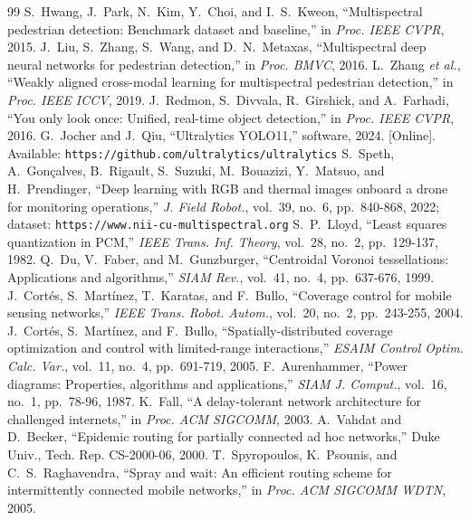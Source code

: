 \documentclass[conference]{IEEEtran}
\begin{document}
\begingroup\scriptsize\setlength{\itemsep}{0pt}\setlength{\parskip}{0pt}\begin{thebibliography}{99}
 S.~Hwang, J.~Park, N.~Kim, Y.~Choi, and I.~S.~Kweon, ``Multispectral pedestrian detection: Benchmark dataset and baseline,'' in \emph{Proc. IEEE CVPR}, 2015.
 J.~Liu, S.~Zhang, S.~Wang, and D.~N.~Metaxas, ``Multispectral deep neural networks for pedestrian detection,'' in \emph{Proc. BMVC}, 2016.
 L.~Zhang \emph{et al.}, ``Weakly aligned cross-modal learning for multispectral pedestrian detection,'' in \emph{Proc. IEEE ICCV}, 2019.
 J.~Redmon, S.~Divvala, R.~Girshick, and A.~Farhadi, ``You only look once: Unified, real-time object detection,'' in \emph{Proc. IEEE CVPR}, 2016.
 G.~Jocher and J.~Qiu, ``Ultralytics YOLO11,'' software, 2024. [Online]. Available: \nolinkurl{https://github.com/ultralytics/ultralytics}
 S.~Speth, A.~Gon\c{c}alves, B.~Rigault, S.~Suzuki, M.~Bouazizi, Y.~Matsuo, and H.~Prendinger, ``Deep learning with RGB and thermal images onboard a drone for monitoring operations,'' \emph{J. Field Robot.}, vol.~39, no.~6, pp.~840-868, 2022; dataset: \nolinkurl{https://www.nii-cu-multispectral.org}
 S.~P.~Lloyd, ``Least squares quantization in PCM,'' \emph{IEEE Trans. Inf. Theory}, vol.~28, no.~2, pp.~129-137, 1982.
 Q.~Du, V.~Faber, and M.~Gunzburger, ``Centroidal Voronoi tessellations: Applications and algorithms,'' \emph{SIAM Rev.}, vol.~41, no.~4, pp.~637-676, 1999.
 J.~Cort\'es, S.~Mart\'inez, T.~Karatas, and F.~Bullo, ``Coverage control for mobile sensing networks,'' \emph{IEEE Trans. Robot. Autom.}, vol.~20, no.~2, pp.~243-255, 2004.
 J.~Cort\'es, S.~Mart\'inez, and F.~Bullo, ``Spatially-distributed coverage optimization and control with limited-range interactions,'' \emph{ESAIM Control Optim. Calc. Var.}, vol.~11, no.~4, pp.~691-719, 2005.
 F.~Aurenhammer, ``Power diagrams: Properties, algorithms and applications,'' \emph{SIAM J. Comput.}, vol.~16, no.~1, pp.~78-96, 1987.
 K.~Fall, ``A delay-tolerant network architecture for challenged internets,'' in \emph{Proc. ACM SIGCOMM}, 2003.
 A.~Vahdat and D.~Becker, ``Epidemic routing for partially connected ad hoc networks,'' Duke Univ., Tech. Rep. CS-2000-06, 2000.
 T.~Spyropoulos, K.~Psounis, and C.~S.~Raghavendra, ``Spray and wait: An efficient routing scheme for intermittently connected mobile networks,'' in \emph{Proc. ACM SIGCOMM WDTN}, 2005.

\end{thebibliography}
\end{document}
